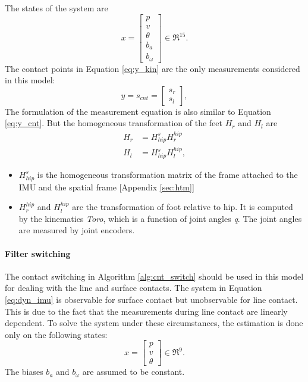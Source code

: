 The states of the system are
\begin{equation}
x = \begin{bmatrix} p \\ v \\ \theta \\ b_a \\ b_{\omega} \end{bmatrix} \in \Re^{15}.
\end{equation}
The contact points in Equation \ref{eq:y_kin} are the only measurements considered in this model:
\begin{equation}
    \label{eq:y_simp}
    y = s_{cnt} = \begin{bmatrix}s_{r}\\ s_{l}\end{bmatrix},
\end{equation}
The formulation of the measurement equation is also similar to Equation \ref{eq:y_cnt}. But the homogeneous transformation of the feet $H_r$ and $H_l$ are 
$$\begin{aligned}
H_r &= H_{hip}^{s}H^{hip}_{r} \\
H_l &= H_{hip}^{s}H^{hip}_{l},
\end{aligned}$$
\begin{itemize}
    \item $H_{hip}^{s}$ is the homogeneous transformation matrix of the frame attached to the IMU and the spatial frame [Appendix \ref{sec:htm}]
    \item $H^{hip}_r$ and $H^{hip}_l$ are the transformation of foot relative to hip. It is computed by the kinematics \emph{Toro}, which is a function of joint angles \emph{q}. The joint angles are measured by joint encoders.
\end{itemize}
\paragraph{Filter switching} The contact switching in Algorithm \ref{alg:cnt_switch} should be used in this model for dealing with the line and surface contacts. The system in Equation \ref{eq:dyn_imu} is observable for surface contact but unobservable for line contact. This is due to the fact that the measurements during line contact are linearly dependent. To solve the system under these circumstances, the estimation is done only on the following states:
\begin{equation}
\label{eq:dyn_imu_red}
x=\begin{bmatrix}
p \\ v\\ \theta
\end{bmatrix} \in \Re^9.
\end{equation} The biases $b_a$ and $b_\omega$ are assumed to be constant. 

